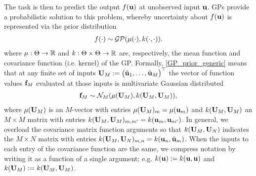 \documentclass[12pt]{article}
\begin{document}
The task is then to predict the output $\f(\bpar)$ at unobserved input $\bpar$. GPs provide a probabilistic solution to this problem, 
whereby uncertainty about $\f(\bpar)$ is represented via the prior distribution 
\begin{align}
\f(\cdot) \sim \GP(\GPMean(\cdot), \GPKer(\cdot, \cdot)). \label{GP_prior_generic}
\end{align}
where $\GPMean: \parSpace \to \R$ and $\GPKer: \parSpace \times \parSpace \to \R$ are, respectively, the mean function and covariance function (i.e. kernel)
of the GP. Formally, \ref{GP_prior_generic} means that at any finite set of inputs 
$\designMat[M] := \begin{pmatrix} \tilde{\bpar}_1, \dots, \tilde{\bpar}_{M} \end{pmatrix}^\top$ the vector of function values $\fObs[M]$ evaluated at those inputs 
is multivariate Gaussian distributed
\begin{align}
\fObs[M] \sim \mathcal{N}_{M}(\GPMean(\designMat[M]), \GPKer(\designMat[M], \designMat[M])),
\end{align}
where $\GPMean(\designMat[M])$ is an $M$-vector with entries $\GPMean(\designMat[M])_m = \GPMean(\bpar_m)$ and 
$\GPKer(\designMat[M], \designMat[M])$ an $M \times M$ matrix with entries $\GPKer(\designMat[M], \designMat[M])_{m,m^\prime} = \GPKer(\bpar_m, \bpar_{m^\prime})$.
In general, we overload the covariance matrix function arguments so that $\GPKer(\designMat[M], \designMat[N])$ indicates the $M \times N$ matrix with entries 
$\GPKer(\designMat[M], \designMat[N])_{m,n} = \GPKer(\bpar_n, \tilde{\bpar}_m)$. 
When the inputs to each entry of the covariance function are the same, we compress notation by writing it as a function of a single argument; 
e.g. $\GPKer(\bpar) := \GPKer(\bpar, \bpar)$ and $\GPKer(\designMat[M]) := \GPKer(\designMat[M], \designMat[M])$. 
\end{document}
